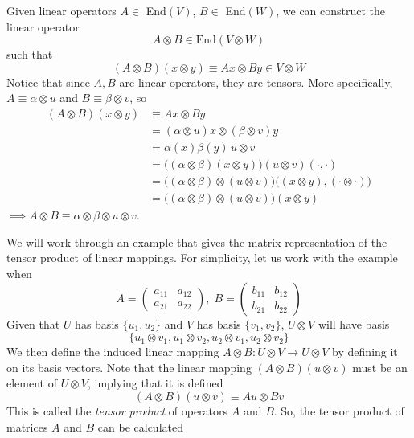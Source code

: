 \documentclass{article}
\begin{document}
    \begin{definition}
    Given linear operators $A \in $ End$(V)$, $B \in $ End$(W)$, we can construct the linear operator 
    \[A \otimes B \in \text{End}(V \otimes W)\] 
    such that 
    \[(A \otimes B) (x \otimes y) \equiv A x \otimes B y \in V \otimes W\]
    Notice that since $A, B$ are linear operators, they are tensors. More specifically, $A \equiv \alpha \otimes u$ and $B \equiv \beta \otimes v$, so
    \begin{align*}
        (A \otimes B) (x \otimes y) & \equiv A x \otimes B y \\
        & = (\alpha \otimes u) x \otimes (\beta \otimes v) y \\
        & = \alpha (x) \beta (y) \, u \otimes v \\
        & = \big((\alpha \otimes \beta)(x \otimes y)\big) (u \otimes v)(\cdot, \cdot) \\
        & = \big((\alpha \otimes \beta) \otimes (u \otimes v)\big) \big((x \otimes y), (\cdot \otimes \cdot)\big) \\
        & = \big((\alpha \otimes \beta) \otimes (u \otimes v)\big)(x \otimes y) 
    \end{align*}
    $\implies A \otimes B \equiv \alpha \otimes \beta \otimes u \otimes v$. 
    \end{definition}
    We will work through an example that gives the matrix representation of the tensor product of linear mappings. For simplicity, let us work with the example when 
    \[A = \begin{pmatrix}
    a_{11} & a_{12} \\ a_{21} & a_{22}
    \end{pmatrix}, \; B = \begin{pmatrix}
    b_{11} & b_{12} \\ b_{21} & b_{22}
    \end{pmatrix}\]
    Given that $U$ has basis $\{u_1, u_2\}$ and $V$ has basis $\{v_1, v_2\}$, $U \otimes V$ will have basis 
    \[\{u_1 \otimes v_1, u_1 \otimes v_2, u_2 \otimes v_1, u_2 \otimes v_2\}\]
    We then define the induced linear mapping $A\otimes B: U \otimes V \longrightarrow U \otimes V$ by defining it on its basis vectors. Note that the linear mapping $(A \otimes B)(u\otimes v)$ must be an element of $U \otimes V$, implying that it is defined
    \[(A \otimes B)(u\otimes v) \equiv Au \otimes Bv\]
    This is called the \textit{tensor product} of operators $A$ and $B$.
    So, the tensor product of matrices $A$ and $B$ can be calculated
\end{document}
